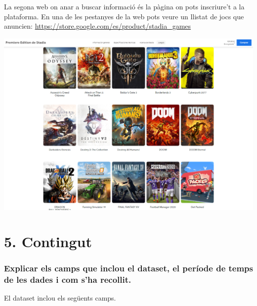 \documentclass[]{article}
\begin{document}
La segona web on anar a buscar informació és la pàgina on pots
inscriure't a la plataforma. En una de les pestanyes de la web pots
veure un llistat de jocs que anuncien:
\url{https://store.google.com/es/product/stadia_games}

\includegraphics{store_google_stadia_games.png}

\hypertarget{contingut}{%
\section{5. Contingut}\label{contingut}}

\hypertarget{explicar-els-camps-que-inclou-el-dataset-el-peruxedode-de-temps-de-les-dades-i-com-sha-recollit.}{%
\subsubsection{Explicar els camps que inclou el dataset, el període de
temps de les dades i com s'ha
recollit.}\label{explicar-els-camps-que-inclou-el-dataset-el-peruxedode-de-temps-de-les-dades-i-com-sha-recollit.}}

El dataset inclou els següents camps.
\end{document}
